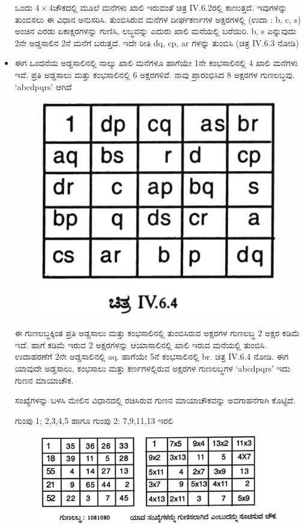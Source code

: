 \begin{itemize}
	ಒಂದು $4 \times 4$ಚೌಕದಲ್ಲಿ ಮೂಲೆ ಮನೆಗಳು ಖಾಲಿ ಇರುವಂತೆ ಚಿತ್ರ IV.6.2ರಲ್ಲಿ ಕಾಣುತ್ತದೆ. ಇವುಗಳನ್ನು ತುಂಬಿಸಲು ಈ ವಿಧಾನ ಅನುಸರಿಸಿ. ತುಂಬಿಸಿರುವ ಮನೆಗಳ ದೀರ್ಘಕರ್ಣಗಳ ಅಕ್ಷರಗಳಲ್ಲಿ (ಉದಾ : b, c, s) ಅಂಚಿನ ಎರಡು ಏಕಾಕ್ಷರಗಳನ್ನು ಗುಣಿಸಿ, ಲಬ್ಧವನ್ನು ಎದುರು ಖಾಲಿ ಮನೆಯಲ್ಲಿ ಬರೆಯಿರಿ. b, s ಎನ್ನುವುದು 2ನೇ ಅಡ್ಡಸಾಲಿನ 2ನೆ ಮನೆಗೆ ಬರುತ್ತದೆ. ಇದೇ ರೀತಿ dq, cp, ar ಗಳನ್ನು ತುಂಬಿಸಿ (ಚಿತ್ರ IV.6.3 ನೋಡಿ)
	\item ಈಗ ಒಂದನೆಯ ಅಡ್ಡಸಾಲಿನಲ್ಲಿ ನಾಲ್ಕು ಖಾಲಿ ಮನೆಗಳೂ ಹಾಗೆಯೇ 1ನೇ ಕಂಭಸಾಲಿನಲ್ಲಿ 4 ಖಾಲಿ ಮನೆಗಳು ಇವೆ. ಪ್ರತಿ ಅಡ್ಡಸಾಲು ಮತ್ತು ಕಂಭಸಾಲಿನಲ್ಲಿ 6 ಅಕ್ಷರಗಳಿವೆ. ನಾವು ಪ್ರಾರಂಭಿಸಿದ 8 ಅಕ್ಷರಗಳ ಗುಣಲಬ್ಧವು. `abcdpqrs' ಆಗಿದೆ
	\begin{figure}[H]
	\includegraphics{src/figures/chap7/fig7.29.jpg}
	\end{figure}

	ಈ ಗುಣಲಬ್ಧಕ್ಕಿಂತ ಪ್ರತಿ ಅಡ್ಡಸಾಲು ಮತ್ತು ಕಂಭಸಾಲಿನಲ್ಲಿ ತುಂಬಿಸಿರುವ ಅಕ್ಷರಗಳ ಗುಣಲಬ್ಧ 2 ಅಕ್ಷರ ಕಡಿಮೆ ಇದೆ. ಹಾಗೆ ಕಡಿಮೆ ಇರುವ 2 ಅಕ್ಷರಗಳನ್ನು ಆಯಾಸಾಲಿನಲ್ಲಿ ಖಾಲಿ ಇರುವ ಮನೆಯಲ್ಲಿ ತುಂಬಿಸಿ. ಉದಾಹರಣೆಗೆ 2ನೇ ಅಡ್ಡಸಾಲಿನಲ್ಲಿ aq. ಹಾಗೆಯೇ 5ನೆ ಕಂಭಸಾಲಿನಲ್ಲಿ br. ಚಿತ್ರ IV.6.4 ನೋಡಿ. ಈಗ ಯಾವುದೇ ಅಡ್ಡಸಾಲು, ಕಂಭಸಾಲು ಮತ್ತು ಕರ್ಣಗಳಲ್ಲಿರುವ ಅಕ್ಷರಗಳ ಗುಣಲಬ್ಧಗಳ `abcdpqrs’ ಇದು ಗುಣನ ಮಾಯಾಚೌಕ.

	ಸಂಖ್ಯೆಗಳನ್ನು ಬಳಸಿ ಮೇಲಿನ ವಿಧಾನದಲ್ಲಿ ರಚಿಸಿರುವ ಗುಣನ ಮಾಯಾಚೌಕವನ್ನು ಅವಗಾಹನೆಗಾಗಿ ಕೊಟ್ಟಿದೆ.

	ಗುಂಪು 1; 2,3,4,5 ಹಾಗೂ ಗುಂಪು 2: 7,9,11,13 ಇರಲಿ
	\begin{figure}[H]
	\includegraphics{src/figures/chap7/fig7.30.jpg}
	\end{figure}
\end{itemize}

